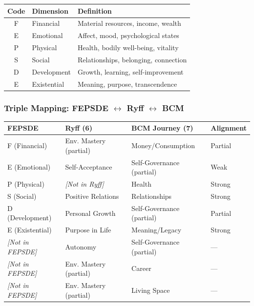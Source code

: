 \begin{center}
\begin{tabular}{@{}cll@{}}
\toprule
\textbf{Code} & \textbf{Dimension} & \textbf{Definition} \\
\midrule
F & Financial & Material resources, income, wealth \\
E & Emotional & Affect, mood, psychological states \\
P & Physical & Health, bodily well-being, vitality \\
S & Social & Relationships, belonging, connection \\
D & Development & Growth, learning, self-improvement \\
E & Existential & Meaning, purpose, transcendence \\
\bottomrule
\end{tabular}
\end{center}

\subsubsection{Triple Mapping: FEPSDE $\leftrightarrow$ Ryff $\leftrightarrow$ BCM}

\begin{center}
\small
\begin{tabular}{@{}llll@{}}
\toprule
\textbf{FEPSDE} & \textbf{Ryff (6)} & \textbf{BCM Journey (7)} & \textbf{Alignment} \\
\midrule
F (Financial) & Env. Mastery (partial) & Money/Consumption & Partial \\
E (Emotional) & Self-Acceptance & Self-Governance (partial) & Weak \\
P (Physical) & \textit{[Not in Ryff]} & Health & Strong \\
S (Social) & Positive Relations & Relationships & Strong \\
D (Development) & Personal Growth & Self-Governance (partial) & Partial \\
E (Existential) & Purpose in Life & Meaning/Legacy & Strong \\
\midrule
\textit{[Not in FEPSDE]} & Autonomy & Self-Governance (partial) & --- \\
\textit{[Not in FEPSDE]} & Env. Mastery (partial) & Career & --- \\
\textit{[Not in FEPSDE]} & Env. Mastery (partial) & Living Space & --- \\
\bottomrule
\end{tabular}
\end{center}


